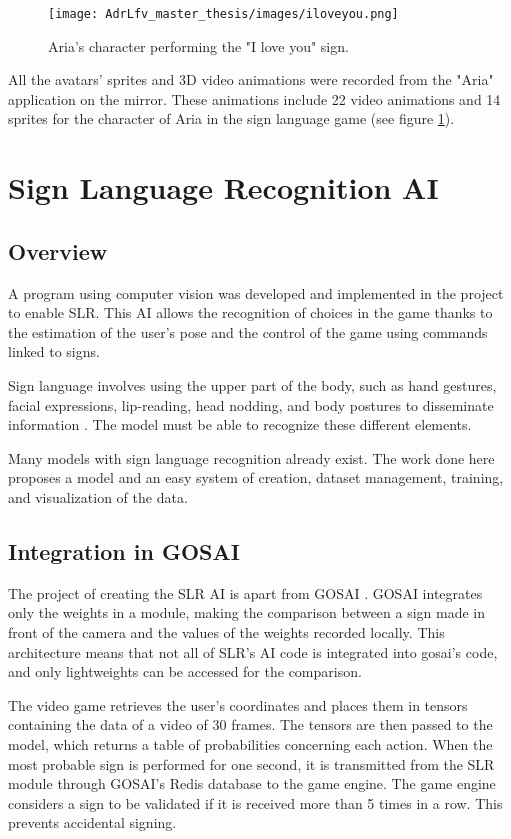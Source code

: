 \begin{figure}[h]
    \centering
    \texttt{[image: AdrLfv\_master\_thesis/images/iloveyou.png]}
    \caption{Aria's character performing the "I love you" sign.}
    \label{fig:iloveyou}
\end{figure}

All the avatars' sprites and 3D video animations were recorded from the "Aria" application on the mirror. These animations include 22 video animations and 14 sprites for the character of Aria in the sign language game (see figure \ref{fig:iloveyou}).

\section{Sign Language Recognition AI}

\subsection{Overview}

A program using computer vision was developed and implemented in the project to enable SLR. This AI allows the recognition of choices in the game thanks to the estimation of the user's pose and the control of the game using commands linked to signs.

Sign language involves using the upper part of the body, such as hand gestures, facial expressions, lip-reading, head nodding, and body postures to disseminate information \cite{adeyanju2021machine}. The model must be able to recognize these different elements.

Many models with sign language recognition already exist. The work done here proposes a model and an easy system of creation, dataset management, training, and visualization of the data.

\subsection{Integration in GOSAI}

The project of creating the SLR AI is apart from GOSAI \cite{slr_mirror}. GOSAI integrates only the weights in a module, making the comparison between a sign made in front of the camera and the values of the weights recorded locally. This architecture means that not all of SLR's AI code is integrated into gosai's code, and only lightweights can be accessed for the comparison.

The video game retrieves the user's coordinates and places them in tensors containing the data of a video of 30 frames. The tensors are then passed to the model, which returns a table of probabilities concerning each action. When the most probable sign is performed for one second, it is transmitted from the SLR module through GOSAI's Redis database to the game engine. The game engine considers a sign to be validated if it is received more than 5 times in a row. This prevents accidental signing.

